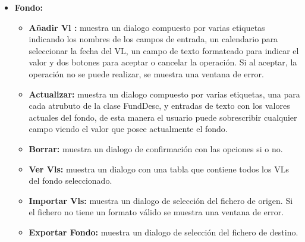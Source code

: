 \documentclass[12pt, a4paper]{book}
\begin{document}
\begin{itemize}
	\item \textbf{Fondo:}
	\begin{itemize}
		\item \textbf{Añadir Vl :} muestra un dialogo compuesto por varias etiquetas indicando los nombres de  los campos de entrada, un calendario para seleccionar la fecha del \gls{VL}, un campo de texto formateado para indicar el valor y dos botones para aceptar o cancelar la operación. Si al aceptar, la operación no se puede realizar, se muestra una ventana de error.
		\item \textbf{Actualizar:} muestra un dialogo compuesto por varias etiquetas, una para cada atrubuto de la clase FundDesc, y entradas de texto con los valores actuales del fondo, de esta manera el usuario puede sobrescribir cualquier campo viendo el valor que posee actualmente el fondo. 
		\item \textbf{Borrar:} muestra un dialogo de confirmación con las opciones si o no.
		\item \textbf{Ver Vls:} muestra un dialogo con una tabla que contiene todos los \gls{VL}s del fondo seleccionado.
		\item \textbf{Importar Vls:} muestra un dialogo de selección del fichero de origen. Si el fichero no tiene un formato válido se muestra una ventana de error.
		\item \textbf{Exportar Fondo:} muestra un dialogo de selección del fichero de destino.
	\end{itemize}
\end{itemize}
\newpage
\end{document}
